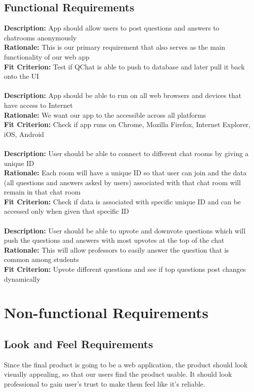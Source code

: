 \documentclass[12pt, titlepage]{article}
\begin{document}
\subsection{Functional Requirements}

\textbf{Description:} App should allow users to post questions and answers to chatrooms anonymously 
\\
\textbf{Rationale:} This is our primary requirement that also serves as the main functionality of our web app 
\\
\textbf{Fit Criterion:} Test if QChat is able to push to database and later pull it back onto the UI 
\\
\\
\textbf{Description:} App should be able to run on all web browsers and devices that have access to Internet 
\\
\textbf{Rationale:} We want our app to the accessible across all platforms 
\\
\textbf{Fit Criterion:} Check if app runs on Chrome, Mozilla Firefox, Internet Explorer, iOS, Android 
\\
\\
\textbf{Description:} User should be able to connect to different chat rooms by giving a unique ID  
\\
\textbf{Rationale:} Each room will have a unique ID so that user can join and the data (all questions and answers asked by users)  associated with that chat room will remain in that chat room 
\\
\textbf{Fit Criterion:} Check if data is associated with specific unique ID and can be accessed only when given that specific ID 
\\
\\
\textbf{Description:} User should be able to upvote and downvote questions which will push the questions and answers with most upvotes at the top of the chat
\\
\textbf{Rationale:} This will allow professors to easily answer the question that is common among students 
\\
\textbf{Fit Criterion:} Upvote different questions and see if top questions post changes dynamically 

\section{Non-functional Requirements}

\subsection{Look and Feel Requirements}
Since the final product is going to be a web application, the product should look visually appealing, so that our users find the product usable. It should look professional to gain user’s trust to make them feel like it's reliable.
\end{document}
